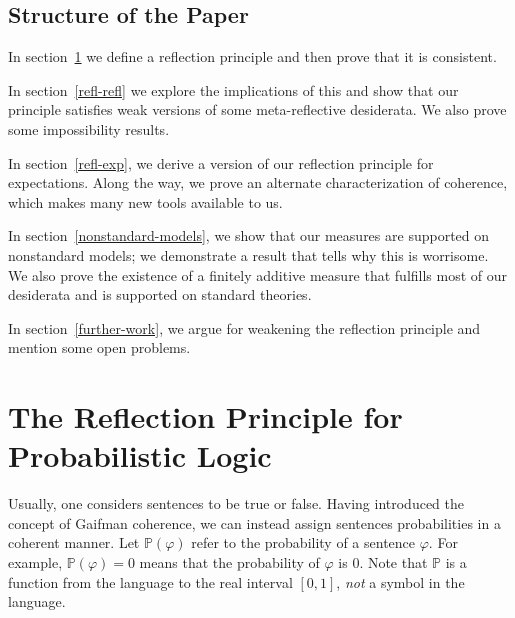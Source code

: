 \documentclass[12pt]{article}
\newcommand{\PP}{\mathbb{P}}
\newcommand{\vp}{\varphi}
\theoremstyle{plain}
\theoremstyle{definition}
\theoremstyle{remark}
\begin{document}
\subsection{Structure of the Paper} %
In section~\ref{refl-cons} we define a reflection principle and then prove that it is consistent. 

In section~\ref{refl-refl} we explore the implications of this and show that our principle satisfies weak versions of some meta-reflective desiderata. We also prove some impossibility results.

In section~\ref{refl-exp}, we derive a version of our reflection principle for expectations. Along the way, we prove an alternate characterization of coherence, which makes many new tools available to us. 

In section~\ref{nonstandard-models}, we show that our measures are supported on nonstandard models; we demonstrate a result that tells why this is worrisome. We also prove the existence of a finitely additive measure that fulfills most of our desiderata and is supported on standard theories. 

In section~\ref{further-work}, we argue for weakening the reflection principle and mention some open problems. 

\section{The Reflection Principle for Probabilistic Logic}
\label{refl-cons}




Usually, one considers sentences to be true or false. Having introduced the concept of Gaifman coherence, we can instead assign sentences probabilities in a coherent manner. Let $\PP(\vp)$ refer to the probability of a sentence $\vp$. For example, $\PP(\vp)=0$ means that the probability of $\vp$ is $0$. Note that $\PP$ is a function from the language to the real interval $[0,1]$, \emph{not} a symbol in the language.
\end{document}

